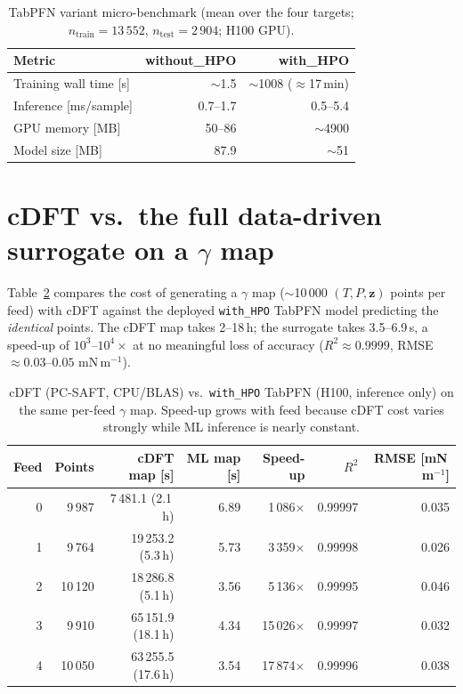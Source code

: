 \documentclass[11pt]{article}
\newcommand{\gmm}{mN\,m$^{-1}$}
\newcommand{\R}{$R^2$}
\begin{document}
\begin{table}[t]
\centering
\caption{TabPFN variant micro-benchmark (mean over the four targets;
$n_\mathrm{train}=13\,552$, $n_\mathrm{test}=2\,904$; H100 GPU).}
\label{tab:tabpfn-cost}
\small
\begin{tabular}{lrr}
\toprule
Metric & without\_HPO & with\_HPO \\
\midrule
Training wall time [s]        & $\sim$1.5      & $\sim$1008 ($\approx$17\,min) \\
Inference [ms/sample]         & 0.7--1.7       & 0.5--5.4 \\
GPU memory [MB]               & 50--86         & $\sim$4900 \\
Model size [MB]               & 87.9           & $\sim$51 \\
\bottomrule
\end{tabular}
\end{table}

\section{cDFT vs.\ the full data-driven surrogate on a $\gamma$ map}
Table~\ref{tab:cdft-vs-ml} compares the cost of generating a $\gamma$ map
($\sim$10\,000 $(T,P,\mathbf{z})$ points per feed) with cDFT against the deployed
\texttt{with\_HPO} TabPFN model predicting the \emph{identical} points. The cDFT
map takes 2--18\,h; the surrogate takes 3.5--6.9\,s, a speed-up of
$10^3$--$10^4\times$ at no meaningful loss of accuracy
($R^2\approx0.9999$, RMSE $\approx0.03$--$0.05$ \gmm).

\begin{table}[t]
\centering
\caption{cDFT (PC-SAFT, CPU/BLAS) vs.\ \texttt{with\_HPO} TabPFN (H100, inference
only) on the same per-feed $\gamma$ map. Speed-up grows with feed because cDFT
cost varies strongly while ML inference is nearly constant.}
\label{tab:cdft-vs-ml}
\small
\begin{tabular}{rrrrrrr}
\toprule
Feed & Points & cDFT map [s] & ML map [s] & Speed-up & \R{} & RMSE [\gmm] \\
\midrule
0 & 9\,987  & 7\,481.1 (2.1\,h)  & 6.89 & 1\,086$\times$  & 0.99997 & 0.035 \\
1 & 9\,764  & 19\,253.2 (5.3\,h) & 5.73 & 3\,359$\times$  & 0.99998 & 0.026 \\
2 & 10\,120 & 18\,286.8 (5.1\,h) & 3.56 & 5\,136$\times$  & 0.99995 & 0.046 \\
3 & 9\,910  & 65\,151.9 (18.1\,h)& 4.34 & 15\,026$\times$ & 0.99997 & 0.032 \\
4 & 10\,050 & 63\,255.5 (17.6\,h)& 3.54 & 17\,874$\times$ & 0.99996 & 0.038 \\
\bottomrule
\end{tabular}
\end{table}
\end{document}
